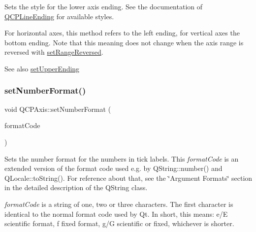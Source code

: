 Sets the style for the lower axis ending. See the documentation of \mbox{\hyperlink{class_q_c_p_line_ending}{Q\+C\+P\+Line\+Ending}} for available styles.

For horizontal axes, this method refers to the left ending, for vertical axes the bottom ending. Note that this meaning does not change when the axis range is reversed with \mbox{\hyperlink{class_q_c_p_axis_a2172fdb196b1a0dc3f40992fcad8e9e1}{set\+Range\+Reversed}}.

\begin{DoxySeeAlso}{See also}
\mbox{\hyperlink{class_q_c_p_axis_a69119b892fc306f651763596685aa377}{set\+Upper\+Ending}} 
\end{DoxySeeAlso}
\mbox{\label{class_q_c_p_axis_ae585a54dc2aac662e90a2ca82f002590}} 
\subsubsection{\texorpdfstring{setNumberFormat()}{setNumberFormat()}}
{\footnotesize\ttfamily void Q\+C\+P\+Axis\+::set\+Number\+Format (\begin{DoxyParamCaption}\item[{const Q\+String \&}]{format\+Code }\end{DoxyParamCaption})}

Sets the number format for the numbers in tick labels. This {\itshape format\+Code} is an extended version of the format code used e.\+g. by Q\+String\+::number() and Q\+Locale\+::to\+String(). For reference about that, see the \char`\"{}\+Argument Formats\char`\"{} section in the detailed description of the Q\+String class.

{\itshape format\+Code} is a string of one, two or three characters. The first character is identical to the normal format code used by Qt. In short, this means\+: \textquotesingle{}e\textquotesingle{}/\textquotesingle{}E\textquotesingle{} scientific format, \textquotesingle{}f\textquotesingle{} fixed format, \textquotesingle{}g\textquotesingle{}/\textquotesingle{}G\textquotesingle{} scientific or fixed, whichever is shorter.

